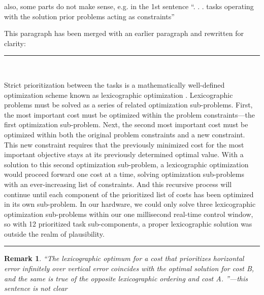 \documentclass[10pt,letterpaper]{letter}
\newcommand*{\ta}[1]{\textcolor[HTML]{107f10}{#1}}
\newcounter{reviewer}
\newtheorem{rev}{Remark}[reviewer]
\newcommand{\reviewer}[1]{\begin{rev} #1\end{rev}}
\newcommand{\response}[1]{\par{\hfill\begin{minipage}{\dimexpr\textwidth-2cm} #1\end{minipage}}}
\newcommand{\paperquote}[1]{%
	\begin{center}
		
		\begin{minipage}{.8\textwidth}
			{\rule{\textwidth}{.5pt}}\vspace{.5em}\\
			\begin{minipage}{\textwidth}\setlength{\parindent}{2em}#1\end{minipage}
			\vspace{.5em}
			{\rule{\textwidth}{.5pt}}
		\end{minipage}%
	\end{center}
}
\begin{document}
\begin{letter}{}
{also, some parts do not make sense, e.g. in the 1st sentence ``. . . tasks operating with the solution prior problems acting as constraints''}
\response{This paragraph has been merged with an earlier paragraph and rewritten for clarity:}
\paperquote{
Strict prioritization between the tasks is a mathematically well-defined optimization scheme known as lexicographic optimization \cite{BouyarmaneKheddar2017TAC}. %
\ta{Lexicographic problems must be solved as a series of related optimization sub-problems. First, the most important cost must be optimized within the problem constraints---the first optimization sub-problem. Next, the second most important cost must be optimized within both the original problem constraints and a new constraint.
	This new constraint requires that the previously minimized cost for the most important objective stays at its previously determined optimal value.
	With a solution to this second optimization sub-problem, a lexicographic optimization would proceed forward one cost at a time, solving optimization sub-problems with an ever-increasing list of constraints.
	And this recursive process will continue until each component of the prioritized list of costs has been optimized in its own sub-problem.%
}
In our hardware, we could \ta{only solve three lexicographic optimization sub-problems within our one millisecond real-time control window, so} with \ta{12 prioritized task sub-components, a proper lexicographic solution} was outside the realm of plausibility.
}

\reviewer{``The lexicographic optimum for a cost that prioritizes horizontal error infinitely over vertical error coincides with the optimal solution for cost B, and the same is true of the opposite lexicographic ordering and cost A. ''---this sentence is not clear
	
}
\end{letter}
\end{document}
